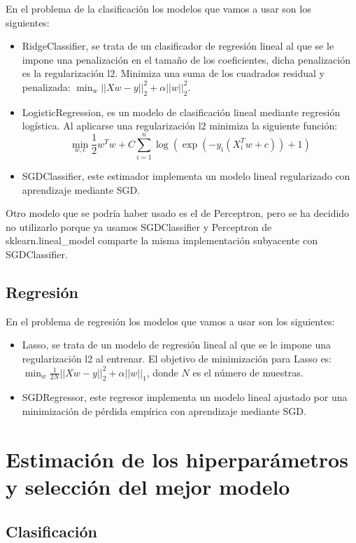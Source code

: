 \documentclass[12pt]{article}
\begin{document}
En el problema de la clasificación los modelos que vamos a usar son los siguientes:

\begin{itemize}
	\item RidgeClassifier, se trata de un clasificador de regresión lineal al que se le impone una penalización en el tamaño de los coeficientes, dicha penalización es la regularización l2. Minimiza una suma de los cuadrados residual y penalizada: $\min_w ||Xw - y||_2^2 + \alpha||w||_2^2 $.
	\item LogisticRegression, es un modelo de clasificación lineal mediante regresión logística. Al aplicarse una regularización l2 minimiza la siguiente función: $$\min_{w, c} \frac{1}{2}w^T w + C \sum_{i=1}^n \log(\exp(- y_i (X_i^T w + c)) + 1)$$
	\item SGDClassifier, este estimador implementa un modelo lineal regularizado con aprendizaje mediante SGD. 
\end{itemize}

Otro modelo que se podría haber usado es el de Perceptron, pero se ha decidido no utilizarlo porque ya usamos SGDClassifier y Perceptron de sklearn.lineal\_model comparte la misma implementación subyacente con SGDClassifier.

\subsection{Regresión}

En el problema de regresión los modelos que vamos a usar son los siguientes:

\begin{itemize}
	\item Lasso, se trata de un modelo de regresión lineal al que se le impone una regularización l2 al entrenar. El objetivo de minimización para Lasso es: $\min_{w} { \frac{1}{2N} ||X w - y||_2 ^ 2 + \alpha ||w||_1} $, donde $N$ es el número de muestras.
	\item SGDRegressor, este regresor implementa un modelo lineal ajustado por una minimización de pérdida empírica con aprendizaje mediante SGD. 
\end{itemize}

\section{Estimación de los hiperparámetros y selección del mejor modelo}

\subsection{Clasificación}
\end{document}
